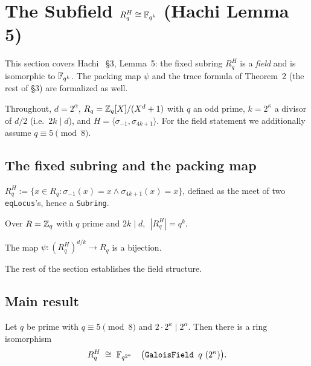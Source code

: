 \section{The Subfield \texorpdfstring{$R_q^H \cong \mathbb{F}_{q^k}$}{R\_q\^{}H ≅ F\_(q\^{}k)} (Hachi Lemma 5)}\label{sec:hachi_subfield}

This section covers Hachi~\cite{NOZ26} \S3, Lemma~5:
the fixed subring $R_q^H$ is a \emph{field} and is isomorphic to $\mathbb{F}_{q^k}$.
The packing map $\psi$ and the trace formula of Theorem~2 (the rest of \S3) are formalized as
well.

Throughout, $d = 2^\alpha$, $R_q = \mathbb{Z}_q[X]/(X^{d}+1)$ with $q$ an odd prime, $k = 2^\kappa$ a
divisor of $d/2$ (i.e.\ $2k \mid d$), and $H = \langle \sigma_{-1}, \sigma_{4k+1}\rangle$.
For the field statement we additionally assume $q \equiv 5 \pmod 8$.

\subsection{The fixed subring and the packing map}

\begin{definition}\label{def:fixedSubring}
\leanok
$R_q^H := \{x \in R_q : \sigma_{-1}(x) = x \wedge \sigma_{4k+1}(x) = x\}$, defined as the meet of
two \texttt{eqLocus}'s, hence a \texttt{Subring}.
\end{definition}

\begin{theorem}[Cardinality, Eq.~7]\label{thm:card_fixedSubring}
\leanok
{}
Over $R = \mathbb{Z}_q$ with $q$ prime and $2k \mid d$, $\;|R_q^H| = q^{k}$.
\end{theorem}

\begin{theorem}\label{thm:psi_bijective}
\leanok
{}
The map $\psi : (R_q^H)^{d/k} \to R_q$ is a bijection.
\end{theorem}

The rest of the section establishes the field structure.

\subsection{Main result}

\begin{theorem}\label{thm:fixedSubring_equiv_galoisField}
\leanok
{}
Let $q$ be prime with $q \equiv 5 \pmod 8$ and $2 \cdot 2^\kappa \mid 2^\alpha$. Then there is a
ring isomorphism
\[
  R_q^{H} \;\cong\; \F_{q^{2^\kappa}} \quad\bigl(\texttt{GaloisField } q\ (2^\kappa)\bigr).
\]
\end{theorem}

